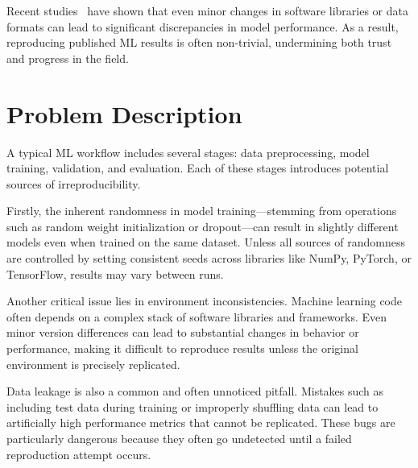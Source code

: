 \documentclass[11pt]{article}
\begin{document}
Recent studies~\cite{DBLP:journals/ncs/X21i,DBLP:conf/qrs/Rivera-LandosKN21} have shown that even 
 minor changes in software libraries or data formats can lead to significant discrepancies in 
 model performance. 
%
As a result, reproducing published ML results is often non-trivial, 
 undermining both trust and progress in the field.


\section{Problem Description}
\label{sec:problem}
A typical ML workflow includes several stages: data preprocessing, model training, validation, and evaluation. Each of these stages introduces potential sources of irreproducibility.

Firstly, the inherent randomness in model training—stemming from operations such as random weight initialization or dropout—can result in slightly different models even when trained on the same dataset. Unless all sources of randomness are controlled by setting consistent seeds across libraries like NumPy, PyTorch, or TensorFlow, results may vary between runs.

Another critical issue lies in environment inconsistencies. Machine learning code often depends on a complex stack of software libraries and frameworks. Even minor version differences can lead to substantial changes in behavior or performance, making it difficult to reproduce results unless the original environment is precisely replicated.

Data leakage is also a common and often unnoticed pitfall. Mistakes such as including test data during training or improperly shuffling data can lead to artificially high performance metrics that cannot be replicated. These bugs are particularly dangerous because they often go undetected until a failed reproduction attempt occurs.
\end{document}
